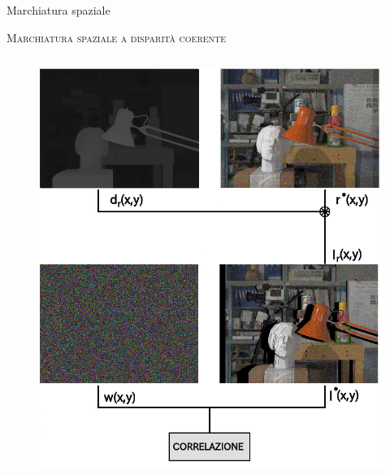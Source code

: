 \documentclass{beamer}
\begin{document}
\begin{section}{Marchiatura spaziale}
\begin{frame}[t]{\textsc{Marchiatura spaziale a disparit\`{a} coerente}}
\begin{columns}
\begin{column}{5cm}
\begin{center}
\begin{figure}
\includegraphics[width=0.9\linewidth]{./img/warp2.png}
\end{figure}
\end{center}
\end{column}
\end{columns}
\end{frame}

\end{section}
\end{document}

